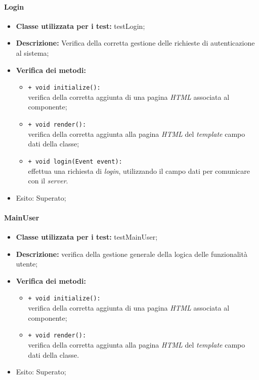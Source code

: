 \paragraph{Login}
\begin{flushleft}
\begin{itemize}
\item \textbf{Classe utilizzata per i test:} testLogin;
\item \textbf{Descrizione:} Verifica della corretta gestione delle richieste di autenticazione al sistema;
\item \textbf{Verifica dei metodi:}
\begin{sloppypar}
\begin{itemize}
\item \texttt{+ void initialize():}\\ verifica della corretta aggiunta di una pagina \textit{HTML} associata al componente;
\item \texttt{+ void render():}\\ verifica della corretta aggiunta alla pagina \textit{HTML} del \textit{template} campo dati della classe;
\item \texttt{+ void login(Event event):}\\ effettua una richiesta di \textit{login}, utilizzando il campo dati \model{} per comunicare con il \textit{server}.
\end{itemize}
\end{sloppypar}
\item Esito: Superato;
\end{itemize}
\end{flushleft}

\paragraph{MainUser}
\begin{flushleft}
\begin{itemize}
\item \textbf{Classe utilizzata per i test:} testMainUser;
\item \textbf{Descrizione:} verifica della gestione generale della logica delle funzionalità utente;
\item \textbf{Verifica dei metodi:}
\begin{sloppypar}
\begin{itemize}
\item \texttt{+ void initialize():}\\ verifica della corretta aggiunta di una pagina \textit{HTML} associata al componente;
\item \texttt{+ void render():}\\ verifica della corretta aggiunta alla pagina \textit{HTML} del \textit{template} campo dati della classe.
\end{itemize}
\end{sloppypar}
\item Esito: Superato;
\end{itemize}
\end{flushleft}

